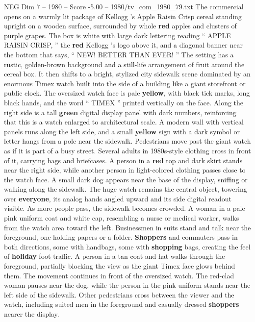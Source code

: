 \begin{textsample}{NEG Dim 7 – 1980 – Score -5.00 – 1980/tv\_com\_1980\_79.txt}  \label{ex:f7_neg_052}
The commercial opens on a warmly lit package of Kellogg ’s Apple Raisin Crisp cereal standing upright on a wooden surface, surrounded by whole \textbf{red} apples and clusters of purple grapes.
The box is white with large dark lettering reading “ APPLE RAISIN CRISP, ” the \textbf{red} Kellogg ’s logo above it, and a diagonal banner near the bottom that says, “ NEW!
BETTER THAN EVER! ” The setting has a rustic, golden-brown background and a still-life arrangement of fruit around the cereal box.
It then shifts to a bright, stylized city sidewalk scene dominated by an enormous Timex watch built into the side of a building like a giant storefront or public clock.
The oversized watch face is pale \textbf{yellow}, with black tick marks, long black hands, and the word “ TIMEX ” printed vertically on the face.
Along the right side is a tall \textbf{green} digital display panel with dark numbers, reinforcing that this is a watch enlarged to architectural scale.
A modern wall with vertical panels runs along the left side, and a small \textbf{yellow} sign with a dark symbol or letter hangs from a pole near the sidewalk.
Pedestrians move past the giant watch as if it is part of a busy street.
Several adults in 1980s-style clothing cross in front of it, carrying bags and briefcases.
A person in a \textbf{red} top and dark skirt stands near the right side, while another person in light-colored clothing passes close to the watch face.
A small dark dog appears near the base of the display, sniffing or walking along the sidewalk.
The huge watch remains the central object, towering over \textbf{everyone}, its analog hands angled upward and its side digital readout visible.
As more people pass, the sidewalk becomes crowded.
A woman in a pale pink uniform coat and white cap, resembling a nurse or medical worker, walks from the watch area toward the left.
Businessmen in suits stand and talk near the foreground, one holding papers or a folder. \textbf{Shoppers} and commuters pass in both directions, some with handbags, some with \textbf{shopping} bags, creating the feel of \textbf{holiday} foot traffic.
A person in a tan coat and hat walks through the foreground, partially blocking the view as the giant Timex face glows behind them.
The movement continues in front of the oversized watch.
The red-clad woman pauses near the dog, while the person in the pink uniform stands near the left side of the sidewalk.
Other pedestrians cross between the viewer and the watch, including suited men in the foreground and casually dressed \textbf{shoppers} nearer the display.

\end{textsample}
